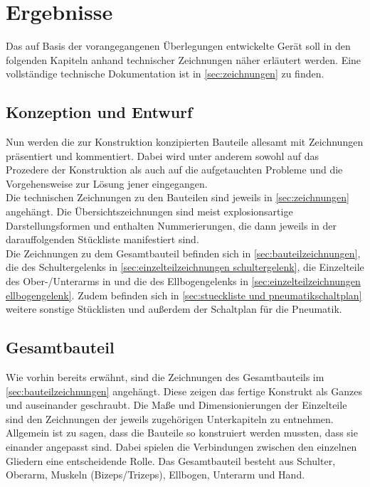 \chapter{Ergebnisse}
	Das auf Basis der vorangegangenen Überlegungen entwickelte Gerät soll in den folgenden Kapiteln anhand technischer Zeichnungen näher erläutert werden.
	Eine vollständige technische Dokumentation ist in \cref{sec:zeichnungen} zu finden.
	\section{Konzeption und Entwurf}
		Nun werden die zur Konstruktion konzipierten Bauteile allesamt mit Zeichnungen präsentiert und kommentiert.
		Dabei wird unter anderem sowohl auf das Prozedere der Konstruktion als auch auf die aufgetauchten Probleme und die Vorgehensweise zur Lösung jener eingegangen.\\
		Die technischen Zeichnungen zu den Bauteilen sind jeweils in \cref{sec:zeichnungen} angehängt.
		Die Übersichtszeichnungen sind meist explosionsartige Darstellungsformen und enthalten Nummerierungen, die dann jeweils in der darauffolgenden Stückliste manifestiert sind.\\
		Die Zeichnungen zu dem Gesamtbauteil befinden sich in \cref{sec:bauteilzeichnungen}, die des Schultergelenks in \cref{sec:einzelteilzeichnungen schultergelenk}, die Einzelteile des Ober-/Unterarms in  und die des Ellbogengelenks in \cref{sec:einzelteilzeichnungen ellbogengelenk}.
		Zudem befinden sich in \cref{sec:stueckliste und pneumatikschaltplan} weitere sonstige Stücklisten und außerdem der Schaltplan für die Pneumatik.
		
	\section{Gesamtbauteil}
		Wie vorhin bereits erwähnt, sind die Zeichnungen des Gesamtbauteils im \cref{sec:bauteilzeichnungen} angehängt.
		Diese zeigen das fertige Konstrukt als Ganzes und auseinander geschraubt.
		Die Maße und Dimensionierungen der Einzelteile sind den Zeichnungen der jeweils zugehörigen Unterkapiteln zu entnehmen.\\
		Allgemein ist zu sagen, dass die Bauteile so konstruiert werden mussten, dass sie einander angepasst sind.
		Dabei spielen die Verbindungen zwischen den einzelnen Gliedern eine entscheidende Rolle.
		Das Gesamtbauteil besteht aus Schulter, Oberarm, Muskeln (Bizeps/Trizeps), Ellbogen, Unterarm und Hand.
	
